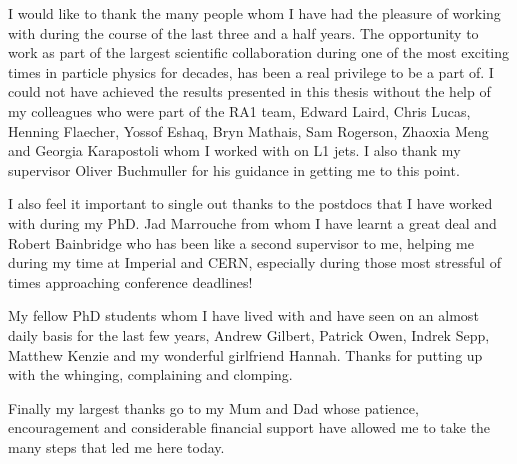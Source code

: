 \begin{acknowledgements}
  I would like to thank the many people whom I have had the pleasure of working with during the course of the last three and a half years. The opportunity to work as part of the largest scientific collaboration during one of the most exciting times in particle physics for decades, has been a real privilege to be a part of. I could not have achieved the results presented in this thesis without the help of my colleagues who were part of the RA1 team, Edward Laird, Chris Lucas, Henning Flaecher, Yossof Eshaq, Bryn Mathais, Sam Rogerson, Zhaoxia Meng and Georgia Karapostoli whom I worked with on L1 jets. I also thank my supervisor Oliver Buchmuller for his guidance in getting me to this point. 
 
I also feel it important to single out thanks to the postdocs that I have worked with during my PhD. Jad Marrouche from whom I have learnt a great deal and Robert Bainbridge who has been like a second supervisor to me, helping me during my time at Imperial and CERN, especially during those most stressful of times approaching conference deadlines! 

My fellow PhD students whom I have lived with and have seen on an almost daily basis for the last few years, Andrew Gilbert, Patrick Owen, Indrek Sepp, Matthew Kenzie and my wonderful girlfriend Hannah. Thanks for putting up with the whinging, complaining and clomping. 

Finally my largest thanks go to my Mum and Dad whose patience, encouragement and considerable financial support have allowed me to take the many steps that led me here today. 
 
\end{acknowledgements}

\tableofcontents
\listoffigures
\listoftables
